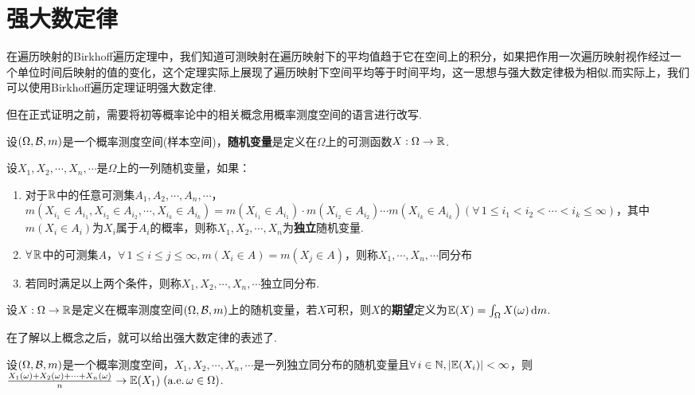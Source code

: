 \section{强大数定律}
在遍历映射的Birkhoff遍历定理中，我们知道可测映射在遍历映射下的平均值趋于它在空间上的积分，如果把作用一次遍历映射视作经过一个单位时间后映射的值的变化，这个定理实际上展现了遍历映射下空间平均等于时间平均，这一思想与强大数定律极为相似.而实际上，我们可以使用Birkhoff遍历定理证明强大数定律.\par
但在正式证明之前，需要将初等概率论中的相关概念用概率测度空间的语言进行改写.\par
\begin{definition}[随机变量]
    设$(\Omega,\mathcal{B},m)$是一个概率测度空间(样本空间)，\textbf{随机变量}是定义在$\Omega$上的可测函数$X:\Omega\to\mathbb{R}$.
\end{definition}
\begin{definition}[独立与同分布]
    设$X_1,X_2,\cdots,X_n,\cdots$是$\Omega$上的一列随机变量，如果：
    \begin{enumerate}[(1)]
        \item  对于$\mathbb{R}$中的任意可测集$A_1,A_2,\cdots,A_n,\cdots$，$m(X_{i_1}\in A_{i_1},X_{i_2}\in A_{i_2},\cdots,X_{i_k}\in A_{i_k})=m(X_{i_1}\in A_{i_1})\cdot m(X_{i_2}\in A_{i_2})\cdots m(X_{i_k}\in A_{i_k})(\forall\, 1\leq i_1<i_2<\cdots<i_k\leq\infty)$，其中$m(X_i\in A_i)$为$X_i$属于$A_i$的概率，则称$X_1,X_2,\cdots,X_n$为\textbf{独立}随机变量.
        \item $\forall\,\mathbb{R}$中的可测集$A$，$\forall\,1\leq i\leq j\leq \infty,m(X_i\in A)=m(X_j\in A)$，则称$X_1,\cdots, X_n,\cdots$同分布
        \item 若同时满足以上两个条件，则称$X_1,X_2,\cdots,X_n,\cdots$独立同分布.
    \end{enumerate}
\end{definition}
\begin{definition}[期望]
    设$X:\Omega\to\mathbb{R}$是定义在概率测度空间$(\Omega,\mathcal{B},m)$上的随机变量，若$X$可积，则$X$的\textbf{期望}定义为$\mathbb{E}(X)=\int_{\Omega}{X(\omega)}\mathop{}\!\mathrm{d} m$.
\end{definition}
在了解以上概念之后，就可以给出强大数定律的表述了.
\begin{theorem}[强大数定律]
    设$(\Omega,\mathcal{B},m)$是一个概率测度空间，$X_1,X_2,\cdots,X_n,\cdots$是一列独立同分布的随机变量且$\forall\, i\in\mathbb{N},|\mathbb{E}(X_i)|<\infty$，则$\frac{X_1(\omega)+X_2(\omega)+\cdots+X_n(\omega)}{n}\to\mathbb{E}(X_1)\;(\operatorname{\text{a.e.}} \omega\in\Omega)$.
\end{theorem}
